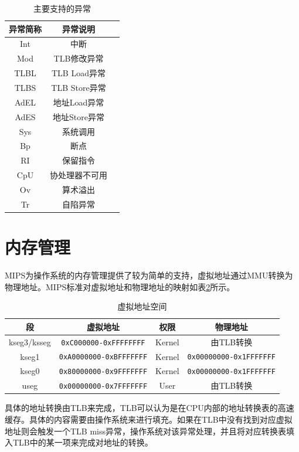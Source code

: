 \begin{table}[htbp]
	\centering
	\begin{tabular}{|c|c|l|} \hline
		\textbf{异常简称} & \textbf{异常说明} \\ \hline
		Int & 中断  \\ \hline
		Mod & TLB修改异常 \\ \hline
		TLBL & TLB Load异常 \\ \hline
		TLBS & TLB Store异常 \\ \hline
		AdEL & 地址Load异常 \\ \hline
		AdES & 地址Store异常 \\ \hline
		Sys & 系统调用 \\ \hline
		Bp & 断点 \\ \hline
		RI & 保留指令 \\ \hline
		CpU & 协处理器不可用 \\ \hline
		Ov & 算术溢出 \\ \hline
		Tr & 自陷异常 \\ \hline
	\end{tabular}
	\caption{主要支持的异常}
	\label{table:main-exception}
\end{table}
\section{内存管理}
MIPS为操作系统的内存管理提供了较为简单的支持，虚拟地址通过MMU转换为物理地址。MIPS标准对虚拟地址和物理地址的映射如表\ref{tab:virtual-address-space}所示。

\begin{table}[htbp]
	\centering
	\begin{tabular}{|c|c|c|c|} \hline
		\textbf{段} & \textbf{虚拟地址} & \textbf{权限} & \textbf{物理地址} \\ \hline
		kseg3/ksseg & \texttt{0xC000000-0xFFFFFFFF} & Kernel & 由TLB转换 \\ \hline
		kseg1 & \texttt{0xA0000000-0xBFFFFFFF} & Kernel & \texttt{0x00000000-0x1FFFFFFF} \\ \hline
		kseg0 & \texttt{0x80000000-0x9FFFFFFF} & Kernel & \texttt{0x00000000-0x1FFFFFFF} \\ \hline
		useg &  \texttt{0x00000000-0x7FFFFFFF} & User & 由TLB转换 \\ \hline
	\end{tabular}
	\caption{虚拟地址空间}
	\label{tab:virtual-address-space}
\end{table}

具体的地址转换由TLB来完成，TLB可以认为是在CPU内部的地址转换表的高速缓存。具体的内容需要由操作系统来进行填充。如果在TLB中没有找到对应虚拟地址则会触发一个TLB miss异常，操作系统对该异常处理，并且将对应转换表填入TLB中的某一项来完成对地址的转换。

